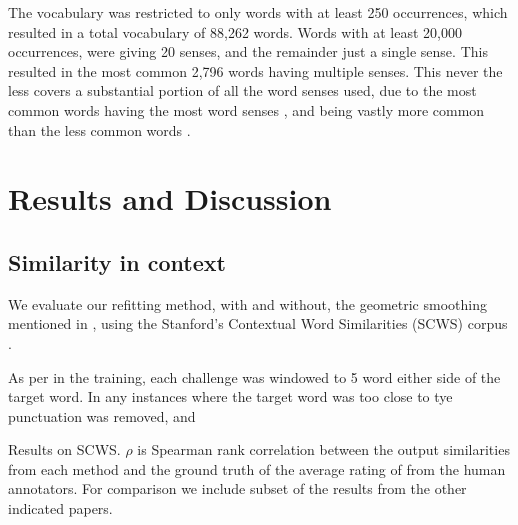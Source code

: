 \documentclass{sig-alternate}
\begin{document}
The vocabulary was restricted to only words with at least 250 occurrences, which resulted in a total vocabulary of 88,262 words. Words with at least 20,000 occurrences, were giving 20 senses, and the remainder just a single sense. This resulted in the most common 2,796 words having multiple senses. This never the less covers a substantial portion of all the word senses used, due to the most common words having the most word senses \parencite{zipf1945meaning}, and being vastly more common than the less common words \parencite{zipf1949human,gilmour2005understanding}.



\section{Results and Discussion} \label{results}


\subsection{Similarity in context}

We evaluate our refitting method, with and without, the geometric smoothing mentioned in , using the Stanford's Contextual Word Similarities (SCWS) corpus \parencite{Huang2012}.

As per in the training, each challenge was windowed to 5 word either side of the target word. In any instances where the target word was too close to tye  
 punctuation was removed, and


\begin{table*}

\caption{Results on SCWS. $\rho$ is Spearman rank correlation between the output similarities from each method and the ground truth of the average rating of from the human annotators. For comparison we include subset of the results from the other indicated papers. } \label{swscres}
\end{table*}
\end{document}
